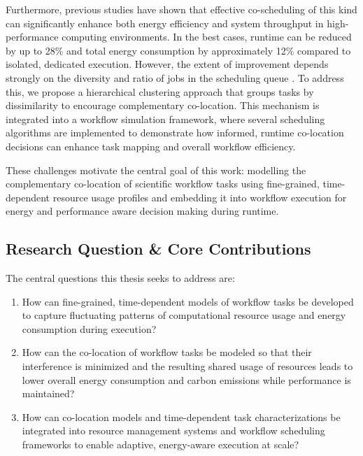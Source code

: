 Furthermore, previous studies have shown that effective co-scheduling of this kind can significantly enhance both energy efficiency and system throughput in high-performance computing environments. In the best cases, runtime can be reduced by up to 28\% and total energy consumption by approximately 12\% compared to isolated, dedicated execution. However, the extent of improvement depends strongly on the diversity and ratio of jobs in the scheduling queue \cite{7349920}. To address this, we propose a hierarchical clustering approach that groups tasks by dissimilarity to encourage complementary co-location. This mechanism is integrated into a workflow simulation framework, where several scheduling algorithms are implemented to demonstrate how informed, runtime co-location decisions can enhance task mapping and overall workflow efficiency.

These challenges motivate the central goal of this work: modelling the complementary co-location of scientific workflow tasks using fine-grained, time-dependent resource usage profiles and embedding it into workflow execution for energy and performance aware decision making during runtime.

\subsection{Research Question \& Core Contributions}
\label{subse:research_question_core_contributions}

The central questions this thesis seeks to address are:

\begin{enumerate}[label=\textbf{RQ}\arabic*]
    \item How can fine-grained, time-dependent models of workflow tasks be developed to capture fluctuating patterns of computational resource usage and energy consumption during execution?
    \item How can the co-location of workflow tasks be modeled so that their interference is minimized and the resulting shared usage of resources leads to lower overall energy consumption and carbon emissions while performance is maintained?
    \item How can co-location models and time-dependent task characterizations be integrated into resource management systems and workflow scheduling frameworks to enable adaptive, energy-aware execution at scale?
\end{enumerate}

